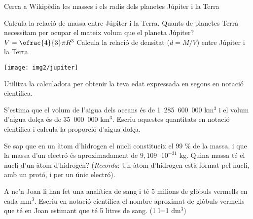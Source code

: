 \begin{mylist}
\vspace{-2cm}
\exer  \begin{minipage}[t]{0.7\textwidth}
	\simbolsearch Cerca a Wikipèdia les masses i els radis dels planetes Júpiter i la Terra
	\begin{tasks}
	\task Calcula la relació de massa entre Júpiter i la Terra.
	\task Quants de planetes Terra necessitam per ocupar el mateix volum que el planeta Júpiter? $V=\ofrac{4}{3}\pi R^3$
	\task Calcula la relació de densitat ($d=M/V$) entre Júpiter i la Terra.
	\end{tasks}
	
\end{minipage}
\begin{minipage}{0.3\textwidth}
	\centering
	\vspace{2cm}
	\texttt{[image: img2/jupiter]}
\end{minipage}





\exer  Utilitza la calculadora per obtenir la teva edat expressada en segons en notació científica.

 


\exer  S'estima que el volum de l'aigua dels oceans és de 1~285~600~000 km${}^{3}$ i el volum d'aigua dolça és de 35~000~000 km${}^{3}$. Escriu aquestes quantitats en notació científica i calcula la proporció d'aigua dolça.

 


\exer  Se sap que en un àtom d'hidrogen el nucli constitueix el 99 \% de la massa, i que la massa d'un electró és aproximadament de  $9,109 \cdot 10^{-31}$ kg. Quina massa té el nucli d'un àtom d'hidrogen? (\textit{Recorda}: Un àtom d'hidrogen està format pel nucli, amb un protó, i per un únic electró).

 


\exer  A ne'n Joan li han fet una analítica de sang i té 5 milions de glòbuls vermells en cada mm${}^{3}$. Escriu en notació científica el nombre aproximat de glòbuls vermells que té en Joan estimant que té 5 litres de sang. (1 l=1 dm$^3$)

\end{mylist}

